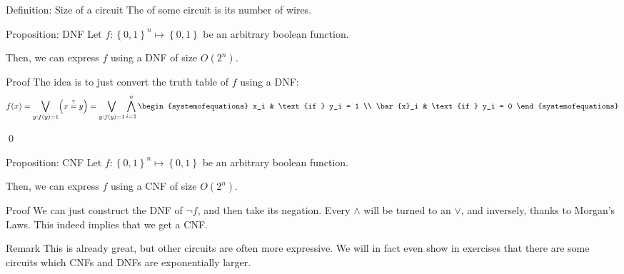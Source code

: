 \documentclass[a4paper]{article}
\begin{document}
\begin{parag}{Definition: Size of a circuit}
    The  of some circuit is its number of wires.
\end{parag}

\begin{parag}{Proposition: DNF}
    Let $f: \left\{0, 1\right\}^n \mapsto \left\{0, 1\right\}$ be an arbitrary boolean function.

    Then, we can express $f$ using a DNF of size $O\left(2^n\right)$.

    \begin{subparag}{Proof}
        The idea is to just convert the truth table of $f$ using a DNF: 
        \[f\left(x\right) = \bigvee_{y: f\left(y\right) = 1} \left(x \over{=}{?} y\right) = \bigvee_{y: f\left(y\right) = 1} \bigwedge_{i=1}^n \begin{systemofequations} x_i & \text{if } y_i = 1 \\ \bar{x}_i & \text{if } y_i = 0 \end{systemofequations} \]
        
        \qed
    \end{subparag}
\end{parag}

\begin{parag}{Proposition: CNF}
    Let $f: \left\{0, 1\right\}^n \mapsto \left\{0, 1\right\}$ be an arbitrary boolean function.

    Then, we can express $f$ using a CNF of size $O\left(2^n\right)$.

    \begin{subparag}{Proof}
        We can just construct the DNF of $\lnot f$, and then take its negation. Every $\land$ will be turned to an $\lor$, and inversely, thanks to Morgan's Laws. This indeed implies that we get a CNF.
    \end{subparag}
    
    \begin{subparag}{Remark}
        This is already great, but other circuits are often more expressive. We will in fact even show in exercises that there are some circuits which CNFs and DNFs are exponentially larger.
    \end{subparag}
\end{parag}
\end{document}
